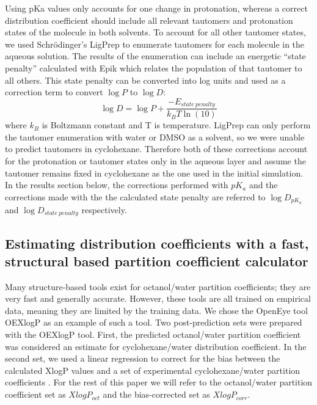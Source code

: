 Using pKa values only accounts for one change in protonation, whereas a correct distribution coefficient should include all relevant tautomers and protonation states of the molecule in both solvents. 
To account for all other tautomer states, we used Schr\"{o}dinger's LigPrep  \cite{ligprep} to enumerate tautomers for each molecule in the aqueous solution. 
The results of the enumeration can include an energetic ``state penalty'' calculated with Epik which relates the population of that tautomer to all others. 
This state penalty can be converted into log units and used as a correction term to convert $\log P$ to $\log D$:
\begin{equation}
\log D = \log P + \frac{-E_{state\ penalty}}{k_BT \ln (10)}
\label{statepenalty}
\end{equation}
where $k_B$ is Boltzmann constant and T is temperature. 
LigPrep can only perform the tautomer enumeration with water or DMSO as a solvent, so we were unable to predict tautomers in cyclohexane. 
Therefore both of these corrections account for the protonation or tautomer states only in the aqueous layer and assume the tautomer remains fixed in cyclohexane as the one used in the initial simulation. In the results section below, the corrections performed with $pK_a$ and the corrections made with the the calculated state penalty are referred to $\log D_{pK_a}$ and $\log D_{state\ penalty}$ respectively. 

\subsection{Estimating distribution coefficients with a fast, structural based partition coefficient calculator}
\label{methods:4}
Many structure-based tools exist for octanol/water partition coefficients; they are very fast and generally accurate. 
However, these tools are all trained on empirical data, meaning they are limited by the training data. 
We chose the OpenEye tool OEXlogP  \cite{RenxiaoWang:1997fa,Wang:2000kk} as an example of such a tool. 
Two post-prediction sets were prepared with the OEXlogP tool.
First, the predicted octanol/water partition coefficient was considered an estimate for cyclohexane/water distribution coefficient.
In the second set, we used a linear regression to correct for the bias between the calculated XlogP values and a set of experimental cyclohexane/water partition coefficients  \cite{Leo:1971wu}.
For the rest of this paper we will refer to the octanol/water partition coefficient set as $XlogP_{oct}$ and the bias-corrected set as $XlogP_{corr}$. 


